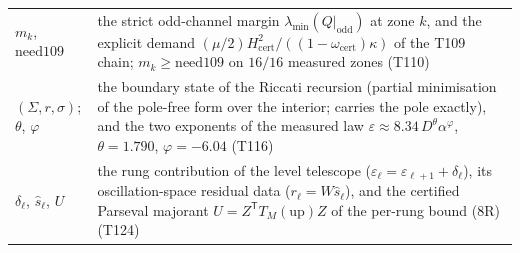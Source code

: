 \documentclass[11pt,a4paper]{article}
\begin{document}
{\begin{tabularx}{\linewidth}{@{}>{\raggedright\arraybackslash}p{3.0cm} Y@{}}
$m_k$, $\mathrm{need109}$ & the strict odd-channel margin $\lambda_{\min}(Q|_{\mathrm{odd}})$ at zone
$k$, and the explicit demand $(\mu/2)H_{\mathrm{cert}}^2/((1-\omega_{\mathrm{cert}})\kappa)$ of the
T109 chain; $m_k\ge\mathrm{need109}$ on $16/16$ measured zones (T110)\\
$(\Sigma,r,\sigma)$; $\theta$, $\varphi$ & the boundary state of the Riccati recursion (partial
minimisation of the pole-free form over the interior; carries the pole exactly), and the two
exponents of the measured law $\varepsilon\approx8.34\,D^{\theta}\alpha^{\varphi}$,
$\theta=1.790$, $\varphi=-6.04$ (T116)\\
$\delta_\ell$, $\hat s_\ell$, $U$ & the rung contribution of the level telescope
($\varepsilon_\ell=\varepsilon_{\ell+1}+\delta_\ell$), its oscillation-space residual data
($r_\ell=W\hat s_\ell$), and the certified Parseval majorant
$U=Z^{\mathsf T}T_M(\mathrm{up})Z$ of the per-rung bound (8R) (T124)\\
\bottomrule
\end{tabularx}
}
\end{document}
